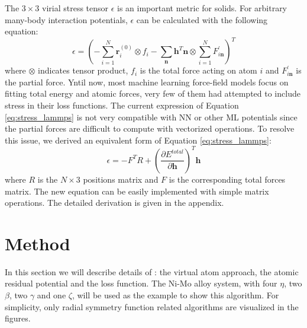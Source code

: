 \documentclass[prb,preprint]{revtex4-2}
\begin{document}
The $3 \times 3$ virial stress tensor $\epsilon$ is an important metric for 
solids. For arbitrary many-body interaction potentials, $\epsilon$ can be 
calculated with the following equation\cite{lammps_stress}:
\begin{equation}
\label{eq:stress_lammps}
\epsilon = \left(-\sum_{i=1}^{N}{\mathbf{r}_i^{(0)} \otimes f_i} - 
\sum_{\mathbf{n}}{\mathbf{h}^T\mathbf{n}} \otimes 
\sum_{i=1}^{N}{F^{\prime}_{i\mathbf{n}}}
\right)^T
\end{equation}
where $\otimes$ indicates tensor product, $f_i$ is the total force acting on 
atom $i$ and $F^{\prime}_{i\mathbf{n}}$ is the partial force. Yntil now, 
most machine learning force-field models focus on fitting total energy and 
atomic forces, very few of them\cite{DeePMD,DeePMD_rl,DeePMD_kit} had attempted 
to include stress in their loss functions. The current expression of Equation 
\ref{eq:stress_lammps} is not very compatible with NN or other ML potentials 
since the partial forces are difficult to compute with vectorized operations. 
To resolve this issue, we derived an equivalent form of Equation 
\ref{eq:stress_lammps}:
\begin{equation}
\label{eq:stress}
\epsilon = -F^{T} R + 
\left(\frac{\partial E^{total}}{\partial \mathbf{h}}\right)^T \mathbf{h}
\end{equation}
where $R$ is the $N \times 3$ positions matrix and $F$ is the corresponding 
total forces matrix. The new equation can be easily implemented with simple 
matrix operations. The detailed derivation is given in the appendix.

% 
%
\section{Method}
\label{section:method}

\newcommand{\nmax}{
    N_{\mathrm{Ni}}^{\mathrm{max}}+N_{\mathrm{Mo}}^{\mathrm{max}}
}
\newcommand{\nijmax}{N_{ij}^{\mathrm{max}}}
\newcommand{\nijkmax}{N_{ijk}^{\mathrm{max}}}

In this section we will describe details of \tensoralloy{}: the virtual atom 
approach, the atomic residual potential and the loss function. The Ni-Mo alloy 
system, with four $\eta$, two $\beta$, two $\gamma$ and one $\zeta$, will be 
used as the example to show this algorithm. For simplicity, only radial symmetry
function related algorithms are visualized in the figures. 
\end{document}
